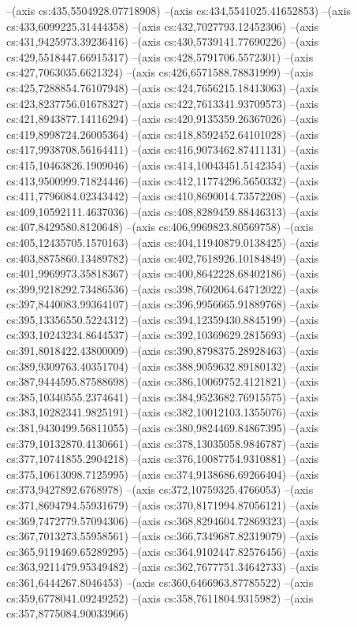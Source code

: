 --(axis cs:435,5504928.07718908)
--(axis cs:434,5541025.41652853)
--(axis cs:433,6099225.31444358)
--(axis cs:432,7027793.12452306)
--(axis cs:431,9425973.39236416)
--(axis cs:430,5739141.77690226)
--(axis cs:429,5518447.66915317)
--(axis cs:428,5791706.5572301)
--(axis cs:427,7063035.6621324)
--(axis cs:426,6571588.78831999)
--(axis cs:425,7288854.76107948)
--(axis cs:424,7656215.18413063)
--(axis cs:423,8237756.01678327)
--(axis cs:422,7613341.93709573)
--(axis cs:421,8943877.14116294)
--(axis cs:420,9135359.26367026)
--(axis cs:419,8998724.26005364)
--(axis cs:418,8592452.64101028)
--(axis cs:417,9938708.56164411)
--(axis cs:416,9073462.87411131)
--(axis cs:415,10463826.1909046)
--(axis cs:414,10043451.5142354)
--(axis cs:413,9500999.71824446)
--(axis cs:412,11774296.5650332)
--(axis cs:411,7796084.02343442)
--(axis cs:410,8690014.73572208)
--(axis cs:409,10592111.4637036)
--(axis cs:408,8289459.88446313)
--(axis cs:407,8429580.8120648)
--(axis cs:406,9969823.80569758)
--(axis cs:405,12435705.1570163)
--(axis cs:404,11940879.0138425)
--(axis cs:403,8875860.13489782)
--(axis cs:402,7618926.10184849)
--(axis cs:401,9969973.35818367)
--(axis cs:400,8642228.68402186)
--(axis cs:399,9218292.73486536)
--(axis cs:398,7602064.64712022)
--(axis cs:397,8440083.99364107)
--(axis cs:396,9956665.91889768)
--(axis cs:395,13356550.5224312)
--(axis cs:394,12359430.8845199)
--(axis cs:393,10243234.8644537)
--(axis cs:392,10369629.2815693)
--(axis cs:391,8018422.43800009)
--(axis cs:390,8798375.28928463)
--(axis cs:389,9309763.40351704)
--(axis cs:388,9059632.89180132)
--(axis cs:387,9444595.87588698)
--(axis cs:386,10069752.4121821)
--(axis cs:385,10340555.2374641)
--(axis cs:384,9523682.76915575)
--(axis cs:383,10282341.9825191)
--(axis cs:382,10012103.1355076)
--(axis cs:381,9430499.56811055)
--(axis cs:380,9824469.84867395)
--(axis cs:379,10132870.4130661)
--(axis cs:378,13035058.9846787)
--(axis cs:377,10741855.2904218)
--(axis cs:376,10087754.9310881)
--(axis cs:375,10613098.7125995)
--(axis cs:374,9138686.69266404)
--(axis cs:373,9427892.6768978)
--(axis cs:372,10759325.4766053)
--(axis cs:371,8694794.55931679)
--(axis cs:370,8171994.87056121)
--(axis cs:369,7472779.57094306)
--(axis cs:368,8294604.72869323)
--(axis cs:367,7013273.55958561)
--(axis cs:366,7349687.82319079)
--(axis cs:365,9119469.65289295)
--(axis cs:364,9102447.82576456)
--(axis cs:363,9211479.95349482)
--(axis cs:362,7677751.34642733)
--(axis cs:361,6444267.8046453)
--(axis cs:360,6466963.87785522)
--(axis cs:359,6778041.09249252)
--(axis cs:358,7611804.9315982)
--(axis cs:357,8775084.90033966)
